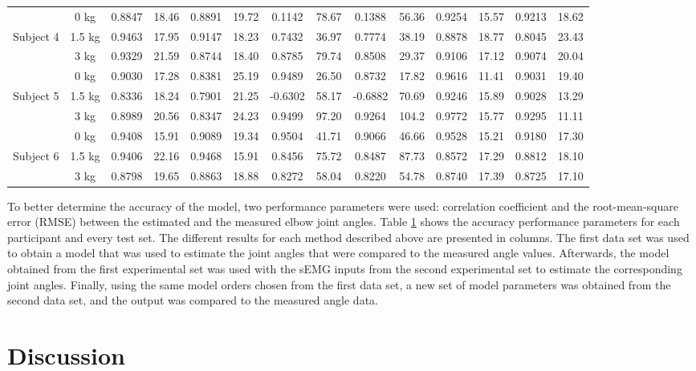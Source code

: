 \documentclass[letterpaper, 10 pt, conference]{ieeeconf}  %
\begin{document}
\begin{table}[t]
{\begin{tabular}{|c c|c c|c c|c c|c c|c c|c c|}
& 0 kg &0.8847 &18.46 &0.8891 &19.72 & 0.1142 & 78.67 & 0.1388 & 56.36 &0.9254 &15.57 &0.9213 &18.62\\
Subject 4 & 1.5 kg &0.9463 &17.95 &0.9147 &18.23 & 0.7432 & 36.97 & 0.7774 & 38.19 &0.8878 &18.77 &0.8045 &23.43\\
& 3 kg &0.9329 &21.59 &0.8744 &18.40 & 0.8785 & 79.74 & 0.8508 & 29.37 &0.9106 &17.12 &0.9074 &20.04\\
\hline

& 0 kg &0.9030 &17.28 &0.8381 &25.19 & 0.9489 & 26.50 & 0.8732 & 17.82 &0.9616 &11.41 &0.9031 &19.40 \\
Subject 5 & 1.5 kg &0.8336 &18.24 &0.7901 &21.25 & -0.6302 & 58.17 & -0.6882 & 70.69 &0.9246 &15.89 &0.9028 &13.29\\
& 3 kg & 0.8989 &20.56 &0.8347 &24.23& 0.9499 & 97.20 & 0.9264 & 104.2 &0.9772 &15.77 &0.9295 &11.11\\
\hline

& 0 kg &0.9408 &15.91 &0.9089 &19.34 & 0.9504 & 41.71 & 0.9066 & 46.66 &0.9528 &15.21 &0.9180 &17.30\\
Subject 6 & 1.5 kg &0.9406 &22.16 &0.9468 &15.91 & 0.8456 & 75.72 & 0.8487 & 87.73 &0.8572 &17.29 &0.8812 &18.10 \\
& 3 kg & 0.8798 & 19.65 &0.8863 &18.88 & 0.8272 & 58.04 & 0.8220 & 54.78 &0.8740 &17.39 &0.8725 &17.10\\
\hline


\end{tabular}%
}
\label{ta:corr}
\end{table}

To better determine the accuracy of the model, two performance parameters were used: correlation coefficient and the root-mean-square error (RMSE) between the estimated and the measured elbow joint angles. Table \ref{ta:corr} shows the accuracy performance parameters for each participant and every test set. The different results for each method described above are presented in columns. The first data set was used to obtain a model that was used to estimate the joint angles that were compared to the measured angle values. Afterwards, the model obtained from the first experimental set was used with the sEMG inputs from the second experimental set to estimate the corresponding joint angles. Finally, using the same model orders chosen from the first data set, a new set of model parameters was obtained from the second data set, and the output was compared to the measured angle data.


\section{Discussion}
\end{document}

